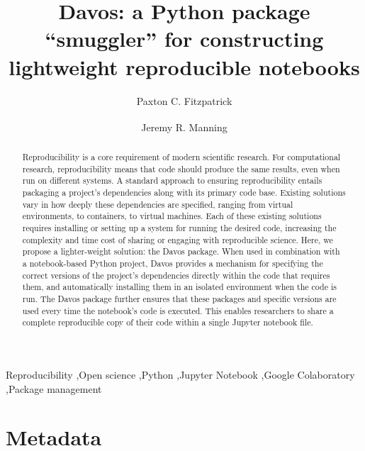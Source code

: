 \documentclass[preprint,12pt,a4paper]{elsarticle}
\begin{document}
\begin{frontmatter}

\title{Davos: a Python package ``smuggler'' for constructing
  lightweight reproducible notebooks}
\author{Paxton C. Fitzpatrick}
\author{Jeremy R. Manning\textsuperscript{\textsubscript{\scriptsize *}}}
\address{Department of Psychological and Brain Sciences\\Dartmouth College, Hanover, NH 03755}


\begin{abstract}
  Reproducibility is a core requirement of modern scientific research.
  For computational research, reproducibility means that code should
  produce the same results, even when run on different systems.  A
  standard approach to ensuring reproducibility entails packaging a
  project's dependencies along with its primary code base.  Existing
  solutions vary in how deeply these dependencies are specified,
  ranging from virtual environments, to containers, to virtual
  machines.  Each of these existing solutions requires installing or
  setting up a system for running the desired code, increasing the
  complexity and time cost of sharing or engaging with reproducible
  science. Here, we propose a lighter-weight solution: the
  Davos package.  When used in combination with a
  notebook-based Python project, Davos provides a mechanism
  for specifying the correct versions of the project's
  dependencies directly within the code that requires them,
  and automatically installing them in an isolated environment
  when the code is run. The Davos package further
  ensures that these packages and specific versions are used every
  time the notebook's code is executed.  This enables researchers to
  share a complete reproducible copy of their code within a single
  Jupyter notebook file.
\end{abstract}


\begin{keyword}
  Reproducibility \sep Open science \sep Python \sep Jupyter Notebook
  \sep Google Colaboratory \sep Package management
\end{keyword}

\end{frontmatter}


\section*{Metadata}
\end{document}
